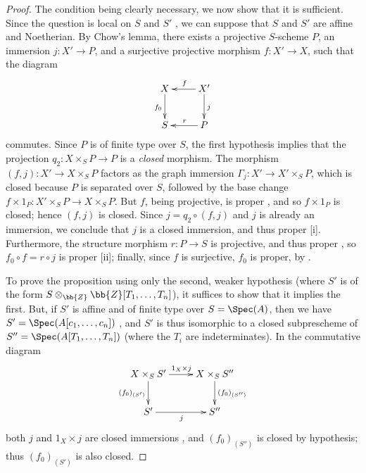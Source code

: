 \begin{proof}
The condition being clearly necessary, we now show that it is sufficient.
Since the question is local on $S$ and $S'$ , we can suppose that $S$ and $S'$ are affine and Noetherian.
By Chow's lemma, there exists a projective $S$-scheme $P$, an immersion $j:X'\to P$, and a surjective projective morphism $f:X'\to X$, such that the diagram
\[
  \xymatrix{
    X\ar[d]_{f_0} &
    X'\ar[l]_f\ar[d]^j\\
    S &
    P\ar[l]_r
  }
\]
commutes.
Since $P$ is of finite type over $S$, the first hypothesis implies that the projection $q_2:X\times_S P\to P$ is a \emph{closed} morphism.
The morphism $(f,j):X'\to X\times_S P$ factors as the graph immersion $\Gamma_j:X'\to X'\times_S P$, which is closed because $P$ is separated over $S$, followed by the base change $f\times1_P:X'\times_S P\to X\times_S P$.
But $f$, being projective, is proper , and so $f\times1_P$ is closed; hence $(f,j)$ is closed.
Since $j=q_2\circ(f,j)$ and $j$ is already an immersion, we conclude that $j$ is a closed immersion, and thus proper [i].
Furthermore, the structure morphism $r:P\to S$ is projective, and thus proper , so $f_0\circ f=r\circ j$ is proper [ii];
finally, since $f$ is surjective, $f_0$ is proper, by .

To prove the proposition using only the second, weaker hypothesis (where $S'$ is of the form $S\otimes_\bb{Z}\bb{Z}[T_1,\ldots,T_n]$), it suffices to show that it implies the first.
But, if $S'$ is affine and of finite type over $S=\Spec(A)$,
then we have $S'=\Spec(A[c_1,\ldots,c_n])$ , and $S'$ is thus isomorphic to a closed subprescheme of $S''=\Spec(A[T_1,\ldots,T_n])$ (where the $T_i$ are indeterminates).
In the commutative diagram
\[
  \xymatrix{
    X\times_S S'\ar[r]^{1_X\times j}\ar[d]_{(f_0)_{(S')}} &
    X\times_S S''\ar[d]^{(f_0)_{(S'')}}\\
    S'\ar[r]_j &
    S''
  }
\]
both $j$ and $1_X\times j$ are closed immersions , and $(f_0)_{(S'')}$ is closed by hypothesis; thus $(f_0)_{(S')}$ is also closed.
\end{proof}
